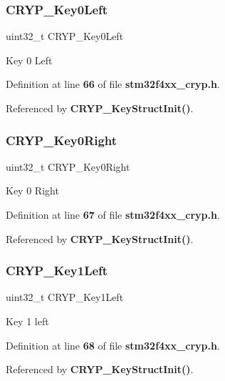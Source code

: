 \subsubsection{C\+R\+Y\+P\+\_\+\+Key0\+Left}
{\footnotesize\ttfamily uint32\+\_\+t C\+R\+Y\+P\+\_\+\+Key0\+Left}

Key 0 Left 

Definition at line \textbf{ 66} of file \textbf{ stm32f4xx\+\_\+cryp.\+h}.



Referenced by \textbf{ C\+R\+Y\+P\+\_\+\+Key\+Struct\+Init()}.

\mbox{\label{structCRYP__KeyInitTypeDef_a03039088b171c114f907971e0e2246eb}} 
\subsubsection{C\+R\+Y\+P\+\_\+\+Key0\+Right}
{\footnotesize\ttfamily uint32\+\_\+t C\+R\+Y\+P\+\_\+\+Key0\+Right}

Key 0 Right 

Definition at line \textbf{ 67} of file \textbf{ stm32f4xx\+\_\+cryp.\+h}.



Referenced by \textbf{ C\+R\+Y\+P\+\_\+\+Key\+Struct\+Init()}.

\mbox{\label{structCRYP__KeyInitTypeDef_aeb4a4df9faa0da133ddc0bf0523bcb30}} 
\subsubsection{C\+R\+Y\+P\+\_\+\+Key1\+Left}
{\footnotesize\ttfamily uint32\+\_\+t C\+R\+Y\+P\+\_\+\+Key1\+Left}

Key 1 left 

Definition at line \textbf{ 68} of file \textbf{ stm32f4xx\+\_\+cryp.\+h}.



Referenced by \textbf{ C\+R\+Y\+P\+\_\+\+Key\+Struct\+Init()}.

